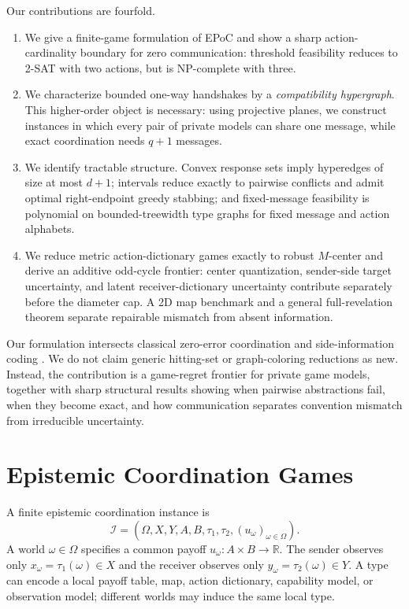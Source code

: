 \documentclass[letterpaper]{article} %
\newcommand{\I}{\mathcal{I}}
\begin{document}
Our contributions are fourfold.
\begin{enumerate}
  \item We give a finite-game formulation of EPoC and show a sharp
  action-cardinality boundary for zero communication: threshold feasibility
  reduces to 2-SAT with two actions, but is NP-complete with three.
  \item We characterize bounded one-way handshakes by a \emph{compatibility
  hypergraph}. This higher-order object is necessary: using projective planes,
  we construct instances in which every pair of private models can share one
  message, while exact coordination needs $q+1$ messages.
  \item We identify tractable structure. Convex response sets imply hyperedges
  of size at most $d+1$; intervals reduce exactly to pairwise conflicts and
  admit optimal right-endpoint greedy stabbing; and fixed-message feasibility
  is polynomial on bounded-treewidth type graphs for fixed message and action
  alphabets.
  \item We reduce metric action-dictionary games exactly to robust
  $M$-center and derive an additive odd-cycle frontier: center quantization,
  sender-side target uncertainty, and latent receiver-dictionary uncertainty
  contribute separately before the diameter cap. A 2D map benchmark and a
  general full-revelation theorem separate repairable mismatch from absent
  information.
\end{enumerate}

Our formulation intersects classical zero-error coordination and side-information
coding \citep{mceliece1971hide,witsenhausen1976zero,abroshan2015zero}.
We do not claim generic hitting-set or graph-coloring reductions as new.
Instead, the contribution is a game-regret frontier for private game models,
together with sharp structural results showing when pairwise abstractions fail,
when they become exact, and how communication separates convention mismatch
from irreducible uncertainty.

\section{Epistemic Coordination Games}

A finite epistemic coordination instance is
\[
\I=(\Omega,X,Y,A,B,\tau_1,\tau_2,(u_\omega)_{\omega\in\Omega}).
\]
A world $\omega\in\Omega$ specifies a common payoff
$u_\omega:A\times B\to\mathbb{R}$. The sender observes only
$x_\omega=\tau_1(\omega)\in X$ and the receiver observes only
$y_\omega=\tau_2(\omega)\in Y$. A type can encode a local payoff table, map,
action dictionary, capability model, or observation model; different worlds
may induce the same local type.
\end{document}
